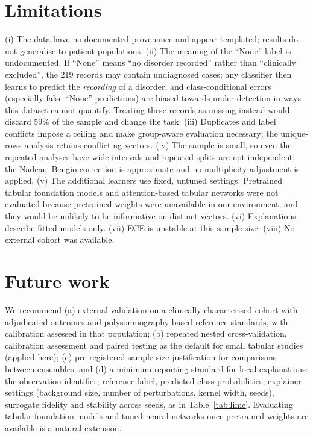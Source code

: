 \documentclass[11pt,a4paper]{article}
\begin{document}
\section{Limitations}
(i) The data have no documented provenance and appear templated; results do not generalise to patient populations. (ii) The meaning of the ``None'' label is undocumented. If ``None'' means ``no disorder recorded'' rather than ``clinically excluded'', the 219 records may contain undiagnosed cases; any classifier then learns to predict the \emph{recording} of a disorder, and class-conditional errors (especially false ``None'' predictions) are biased towards under-detection in ways this dataset cannot quantify. Treating these records as missing instead would discard 59\% of the sample and change the task. (iii) Duplicates and label conflicts impose a ceiling and make group-aware evaluation necessary; the unique-rows analysis retains conflicting vectors. (iv) The sample is small, so even the repeated analyses have wide intervals and repeated splits are not independent; the Nadeau--Bengio correction is approximate and no multiplicity adjustment is applied. (v) The additional learners use fixed, untuned settings. Pretrained tabular foundation models and attention-based tabular networks \citep{hollmann2025} were not evaluated because pretrained weights were unavailable in our environment, and they would be unlikely to be informative on \NVec{} distinct vectors. (vi) Explanations describe fitted models only. (vii) ECE is unstable at this sample size. (viii) No external cohort was available.

\section{Future work}
We recommend (a) external validation on a clinically characterised cohort with adjudicated outcomes and polysomnography-based reference standards, with calibration assessed in that population; (b) repeated nested cross-validation, calibration assessment and paired testing as the default for small tabular studies (applied here); (c) pre-registered sample-size justification for comparisons between ensembles; and (d) a minimum reporting standard for local explanations: the observation identifier, reference label, predicted class probabilities, explainer settings (background size, number of perturbations, kernel width, seeds), surrogate fidelity and stability across seeds, as in Table~\ref{tab:lime}. Evaluating tabular foundation models and tuned neural networks once pretrained weights are available is a natural extension.
\end{document}
